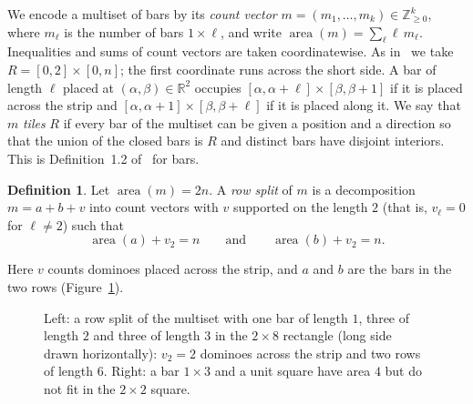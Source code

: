 \documentclass[11pt]{article}
\theoremstyle{definition}
\newtheorem{definition}{Definition}
\theoremstyle{remark}
\newcommand{\area}{\operatorname{area}}
\begin{document}
We encode a multiset of bars by its \emph{count vector}
$m=(m_1,\dots,m_k)\in\mathbb Z_{\ge0}^k$, where $m_\ell$ is the number of bars
$1\times\ell$, and write $\area(m)=\sum_\ell \ell\,m_\ell$. Inequalities and sums of count vectors are taken coordinatewise.
As in~\cite{gvz} we take $R=[0,2]\times[0,n]$; the first coordinate runs across
the short side. A bar of length $\ell$ placed at $(\alpha,\beta)\in\mathbb R^2$
occupies $[\alpha,\alpha+\ell]\times[\beta,\beta+1]$ if it is placed across
the strip and $[\alpha,\alpha+1]\times[\beta,\beta+\ell]$ if it is placed
along it. We say that $m$ \emph{tiles} $R$ if every bar of the multiset can be
given a position and a direction so that the union of the closed bars is $R$
and distinct bars have disjoint interiors. This is Definition~1.2 of~\cite{gvz}
for bars.

\begin{definition}
Let $\area(m)=2n$. A \emph{row split} of $m$ is a decomposition $m=a+b+v$ into
count vectors with $v$ supported on the length $2$ (that is, $v_\ell=0$ for
$\ell\ne2$) such that
\[
\area(a)+v_2=n\qquad\text{and}\qquad\area(b)+v_2=n .
\]
\end{definition}

\noindent Here $v$ counts dominoes placed across the strip, and $a$ and $b$
are the bars in the two rows (Figure~\ref{fig:split}).

\begin{figure}[ht]
\centering
{}
\caption{Left: a row split of the multiset with one bar of length $1$, three
of length $2$ and three of length $3$ in the $2\times8$ rectangle (long side
drawn horizontally): $v_2=2$ dominoes across the strip and two rows of length
$6$. Right: a bar $1\times3$ and a unit square have area $4$ but do not fit
in the $2\times2$ square.}
\label{fig:split}
\end{figure}
\end{document}
